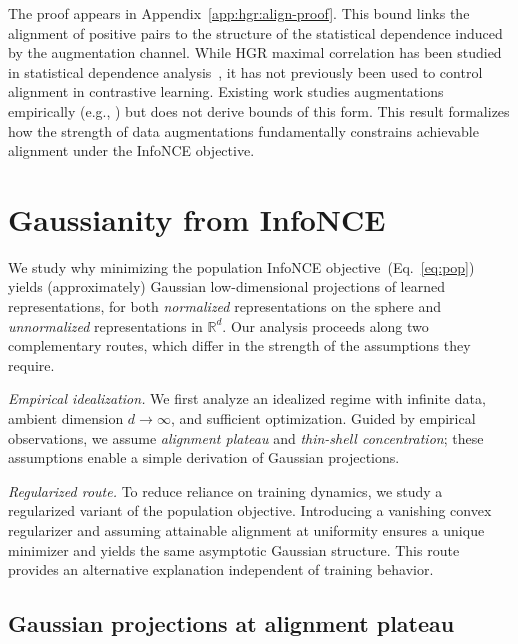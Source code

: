 \documentclass{article}
\newcommand{\R}{\mathbb{R}}
\newcommand{\peqref}[1]{(Eq.~\ref{#1})}
\begin{document}
\noindent The proof appears in Appendix~\ref{app:hgr:align-proof}. This bound links the alignment of positive pairs to the structure of the statistical dependence induced by the augmentation channel. 
While HGR maximal correlation has been studied in statistical dependence analysis~\citep{huang2020sample,zhang2024hgr}, it has not previously been used to control alignment in contrastive learning. Existing work studies augmentations empirically (e.g., \citet{tian2020makes}) but does not derive bounds of this form.
This result formalizes how the strength of data augmentations fundamentally constrains achievable alignment under the InfoNCE objective.

\section{Gaussianity from InfoNCE}
\label{sec:gauss-routes}

We study why minimizing the population InfoNCE objective~\peqref{eq:pop} yields (approximately) Gaussian low-dimensional projections of learned representations, for both \emph{normalized} representations on the sphere and \emph{unnormalized} representations in $\R^d$. Our analysis proceeds along two complementary routes, which differ in the strength of the assumptions they require.

\emph{Empirical idealization.}
We first analyze an idealized regime with infinite data, ambient dimension $d \to \infty$, and sufficient optimization. Guided by empirical observations, we assume \emph{alignment plateau} and \emph{thin-shell concentration}; these assumptions enable a simple derivation of Gaussian projections.

\emph{Regularized route.}
To reduce reliance on training dynamics, we study a regularized variant of the population objective. Introducing a vanishing convex regularizer and assuming attainable alignment at uniformity ensures a unique minimizer and yields the same asymptotic Gaussian structure. This route provides an alternative explanation independent of training behavior.

\subsection{Gaussian projections at alignment plateau}
\label{sec:gauss-plateau}
\end{document}
